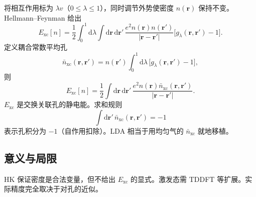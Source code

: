 将相互作用标为 $\lambda v$（$0\le\lambda\le1$），同时调节外势使密度 $n(\mathbf{r})$ 保持不变。Hellmann--Feynman 给出
\begin{equation}
  E_{\mathrm{xc}}[n]
  =\frac12
  \int_0^1\mathrm{d}\lambda
  \int\mathrm{d}\mathbf{r}\,\mathrm{d}\mathbf{r}'\,
  \frac{e^2 n(\mathbf{r})n(\mathbf{r}')}{|\mathbf{r}-\mathbf{r}'|}
  \bigl[g_\lambda(\mathbf{r},\mathbf{r}')-1\bigr].
\label{eq:adiab_xc}
\end{equation}
定义耦合常数平均孔
\begin{equation}
  \bar n_{\mathrm{xc}}(\mathbf{r},\mathbf{r}')
  =n(\mathbf{r}')
  \int_0^1\mathrm{d}\lambda\,
  \bigl[g_\lambda(\mathbf{r},\mathbf{r}')-1\bigr],
\end{equation}
则
\begin{equation}
  E_{\mathrm{xc}}[n]
  =\frac12\int\mathrm{d}\mathbf{r}\,\mathrm{d}\mathbf{r}'\,
  \frac{e^2 n(\mathbf{r})\bar n_{\mathrm{xc}}(\mathbf{r},\mathbf{r}')}
  {|\mathbf{r}-\mathbf{r}'|}.
\end{equation}
$E_{\mathrm{xc}}$ 是交换关联孔的静电能。求和规则
\begin{equation}
  \int\mathrm{d}\mathbf{r}'\,\bar n_{\mathrm{xc}}(\mathbf{r},\mathbf{r}')=-1
\end{equation}
表示孔积分为 $-1$（自作用扣除）。LDA 相当于用均匀气的 $\bar n_{\mathrm{xc}}$ 就地移植。

\subsection{意义与局限}

HK 保证密度是合法变量，但不给出 $E_{\mathrm{xc}}$ 的显式。激发态需 TDDFT 等扩展。实际精度完全取决于对孔的近似。
